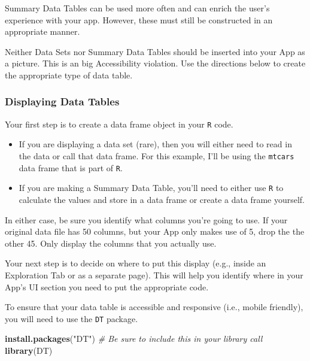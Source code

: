 \documentclass[
]{book}
\newenvironment{Shaded}{\begin{snugshade}}{\end{snugshade}}
\newcommand{\CommentTok}[1]{\textcolor[rgb]{0.56,0.35,0.01}{\textit{#1}}}
\newcommand{\KeywordTok}[1]{\textcolor[rgb]{0.13,0.29,0.53}{\textbf{#1}}}
\newcommand{\NormalTok}[1]{#1}
\newcommand{\StringTok}[1]{\textcolor[rgb]{0.31,0.60,0.02}{#1}}
\providecommand{\tightlist}{%
  \setlength{\itemsep}{0pt}\setlength{\parskip}{0pt}}
\begin{document}
Summary Data Tables can be used more often and can enrich the user's experience with your app. However, these must still be constructed in an appropriate manner.

Neither Data Sets nor Summary Data Tables should be inserted into your App as a picture. This is an big Accessibility violation. Use the directions below to create the appropriate type of data table.

\hypertarget{displaying-data-tables}{%
\subsubsection{Displaying Data Tables}\label{displaying-data-tables}}

Your first step is to create a data frame object in your \texttt{R} code.

\begin{itemize}
\tightlist
\item
  If you are displaying a data set (rare), then you will either need to read in the data or call that data frame. For this example, I'll be using the \texttt{mtcars} data frame that is part of \texttt{R}.
\item
  If you are making a Summary Data Table, you'll need to either use \texttt{R} to calculate the values and store in a data frame or create a data frame yourself.
\end{itemize}

In either case, be sure you identify what columns you're going to use. If your original data file has 50 columns, but your App only makes use of 5, drop the the other 45. Only display the columns that you actually use.

Your next step is to decide on where to put this display (e.g., inside an Exploration Tab or as a separate page). This will help you identify where in your App's UI section you need to put the appropriate code.

To ensure that your data table is accessible and responsive (i.e., mobile friendly), you will need to use the \texttt{DT} package.

\begin{Shaded}
\begin{Highlighting}[]
\KeywordTok{install.packages}\NormalTok{(}\StringTok{"DT"}\NormalTok{)}
\CommentTok{# Be sure to include this in your library call}
\KeywordTok{library}\NormalTok{(DT)}
\end{Highlighting}
\end{Shaded}
\end{document}
